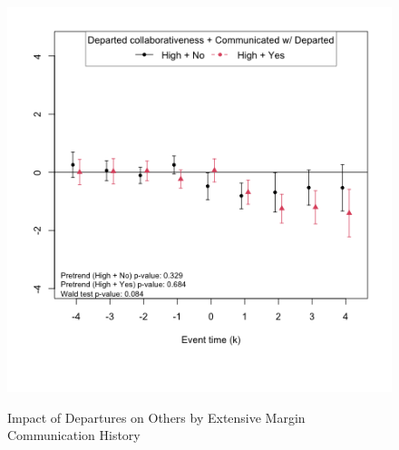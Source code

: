 \begin{figure}[htbp]
    \caption{Impact of Departures on Others by Extensive Margin Communication History}
    \label{fig:prs_opened_comm_ext_marg}
    \centering
        \begin{minipage}[b]{0.49\textwidth}
        \centering
         \label{fig:predep_prs_opened_high_collab_comm_ext_marg}
        \includegraphics[width=\textwidth]{temp/output/collab/cs_norm_prs_opened_dept_never_comm_predep_High.png}
    \end{minipage}
    \hfill
    \label{fig:prs_opened_comm_ext_marg_low}
    \centering
        \begin{minipage}[b]{0.49\textwidth}
        \centering
         \label{fig:predep_prs_opened_low_collab_comm_ext_marg}

\end{minipage}
\end{figure}
